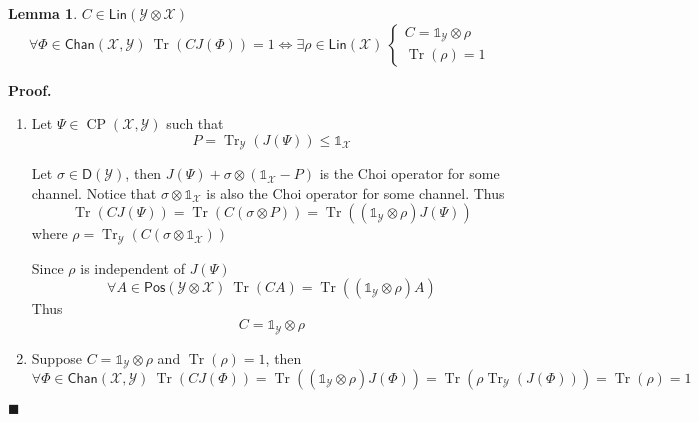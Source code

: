 \documentclass[aps,pra,onecolumn,notitlepage,superscriptaddress]{revtex4-1}
\newcommand{\spc}[1]{\mathcal{#1}}
\newcommand{\Lin}{\mathsf{Lin}}
\newcommand{\Pos}{\mathsf{Pos}}
\newcommand{\D}{\mathsf{D}}
\newcommand{\Tr}{\operatorname{Tr}}
\newcommand{\op}[1]{\operatorname{#1}}
\newcommand{\Chan}{{\mathsf{Chan}}}
\newcommand\I{\mathds{1}}
\newtheorem{lemma}{Lemma}
\def\Proof{{\bf Proof.~}}
\def\qed{$\blacksquare$ \newline}
\begin{document}
    \begin{lemma} \label{choi op}
        $C \in \Lin(\spc Y \otimes \spc X)$
        \begin{equation}
            \forall \Phi \in \Chan(\spc X, \spc Y) \ \Tr(CJ(\Phi)) = 1 \Longleftrightarrow \exists \rho \in \Lin(\spc X) \
            \begin{cases}
                C = \I_{\spc Y} \otimes \rho \\
                \Tr(\rho) = 1
            \end{cases}
        \end{equation}
    \end{lemma}
    \Proof {
        \begin{enumerate}
            \item Let $\Psi \in \op{CP}(\spc X, \spc Y)$ such that
            \begin{equation}
                P = \Tr_{\spc Y}(J(\Psi)) \leq \I_{\spc X}
            \end{equation}
            
            Let $\sigma \in \D(\spc Y)$, then $J(\Psi) + \sigma \otimes (\I_{\spc X}-P)$ is the Choi operator for some channel.
            Notice that $\sigma \otimes \I_{\spc X}$ is also the Choi operator for some channel. Thus
            \begin{equation}
                \Tr(CJ(\Psi)) = \Tr(C(\sigma \otimes P)) = \Tr((\I_{\spc Y} \otimes \rho)J(\Psi))
            \end{equation}
            where $\rho = \Tr_{\spc Y}(C(\sigma \otimes \I_{\spc X}))$

            Since $\rho$ is independent of $J(\Psi)$
            \begin{equation}
                \forall A \in \Pos(\spc Y \otimes \spc X) \ \Tr(CA) = \Tr((\I_{\spc Y} \otimes \rho) A)
            \end{equation}
            Thus
            \begin{equation}
                C = \I_{\spc Y} \otimes \rho
            \end{equation}

            \item Suppose $C = \I_{\spc Y} \otimes \rho$ and $\Tr(\rho) = 1$, then
            \begin{equation}
                \forall \Phi \in \Chan(\spc X, \spc Y) \ \Tr(CJ(\Phi)) = \Tr((\I_{\spc Y} \otimes \rho)J(\Phi)) = \Tr(\rho \Tr_{\spc Y}(J(\Phi))) = \Tr(\rho) = 1
            \end{equation}
        \end{enumerate}
    } \qed
\end{document}
